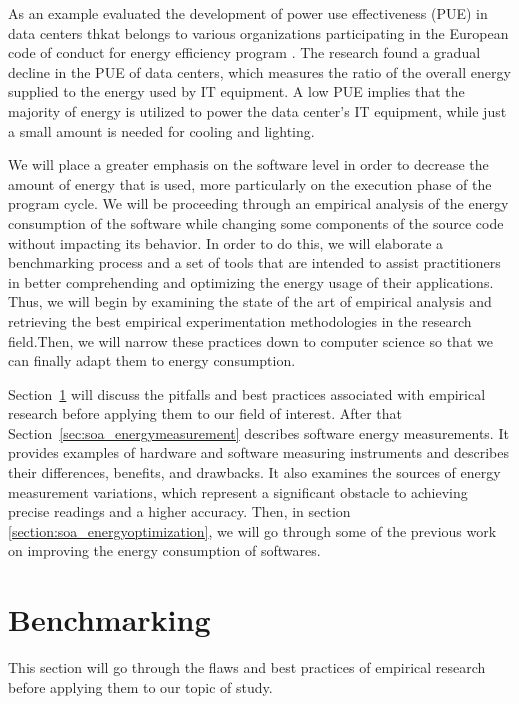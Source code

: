 As an example \citeauthor{avgerinou_trends_2017} evaluated the development of power use effectiveness (PUE) in data centers thkat belongs to various organizations participating in the European code of conduct for energy efficiency program \cite{avgerinou_trends_2017}.
The research found a gradual decline in the PUE of data centers, which measures the ratio of the overall energy supplied to the energy used by IT equipment.
A low PUE implies that the majority of energy is utilized to power the data center's IT equipment, while just a small amount is needed for cooling and lighting.

We will place a greater emphasis on the software level in order to decrease the amount of energy that is used, more particularly on the execution phase of the program cycle.
We will be proceeding through an empirical analysis of the energy consumption of the software while changing some components of the source code without impacting its behavior.
In order to do this, we will elaborate a benchmarking process and a set of tools that are intended to assist practitioners in better comprehending and optimizing the energy usage of their applications.
Thus, we will begin by examining the state of the art of empirical analysis and retrieving the best empirical experimentation methodologies in the research field.Then, we will narrow these practices down to computer science so that we can finally adapt them to energy consumption.

Section~\ref{sec:soa_benchmarking} will discuss the pitfalls and best practices associated with empirical research before applying them to our field of interest.
After that Section~\ref{sec:soa_energymeasurement} describes software energy measurements.
It provides examples of hardware and software measuring instruments and describes their differences, benefits, and drawbacks. It also examines the sources of energy measurement variations, which represent a significant obstacle to achieving precise readings and a higher accuracy.
Then, in section \ref{section:soa_energyoptimization}, we will go through some of the previous work on improving the energy consumption of softwares.

\newpage
\section{Benchmarking}\label{sec:soa_benchmarking}
This section will go through the flaws and best practices of empirical research before applying them to our topic of study.

